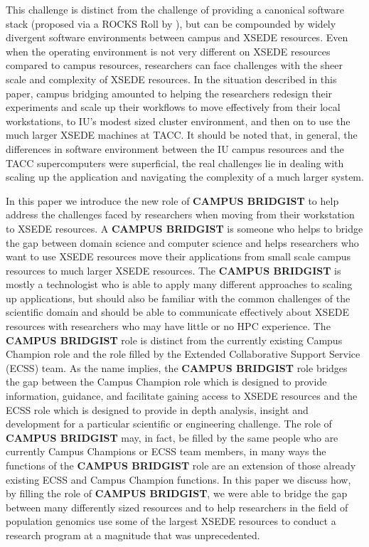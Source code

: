 \documentclass{sig-alternate}
\begin{document}
This challenge is distinct from the challenge of providing a canonical software stack (proposed via a ROCKS
Roll by \citeauthor{stewart2012}), but can be compounded by widely divergent software environments between
campus and XSEDE resources. Even when the operating environment is not very different on XSEDE resources
compared to campus resources, researchers can face challenges with the sheer scale and complexity of XSEDE
resources. In the situation described in this paper, campus bridging amounted to helping the researchers
redesign their experiments and scale up their workflows to move effectively from their local workstations, to IU's modest
sized cluster environment, and then on to use the much larger XSEDE machines at TACC. It should be
noted that, in general, the differences in software environment between the IU campus resources and the TACC
supercomputers were superficial, the real challenges lie in dealing with scaling up the application and
navigating the complexity of a much larger system.

In this paper we introduce the new role of {\bf CAMPUS BRIDGIST} to help address the challenges faced by
researchers when moving from their workstation to XSEDE resources. A {\bf CAMPUS BRIDGIST} is someone who
helps to bridge the gap between domain science and computer science and helps researchers who want to use
XSEDE resources move their applications from small scale campus resources to much larger XSEDE resources. The
{\bf CAMPUS BRIDGIST} is mostly a technologist who is able to apply many different approaches to scaling up
applications, but should also be familiar with the common challenges of the scientific domain and should be
able to communicate effectively about XSEDE resources with researchers who may have little or no HPC
experience. The {\bf CAMPUS BRIDGIST} role is distinct from the currently existing Campus Champion role and
the role filled by the Extended Collaborative Support Service (ECSS) team. As the name implies, the {\bf
  CAMPUS BRIDGIST} role bridges the gap between the Campus Champion role which is designed to provide
information, guidance, and facilitate gaining access to XSEDE resources and the ECSS role which is designed to
provide in depth analysis, insight and development for a particular scientific or engineering challenge. The
role of {\bf CAMPUS BRIDGIST} may, in fact, be filled by the same people who are currently Campus Champions or
ECSS team members, in many ways the functions of the {\bf CAMPUS BRIDGIST} role are an extension of those
already existing ECSS and Campus Champion functions. In this paper we discuss how, by filling the role of
{\bf CAMPUS BRIDGIST}, we were able to bridge the gap between many differently sized resources and to help
researchers in the field of population genomics use some of the largest XSEDE resources to conduct a research
program at a magnitude that was unprecedented.
\end{document}
